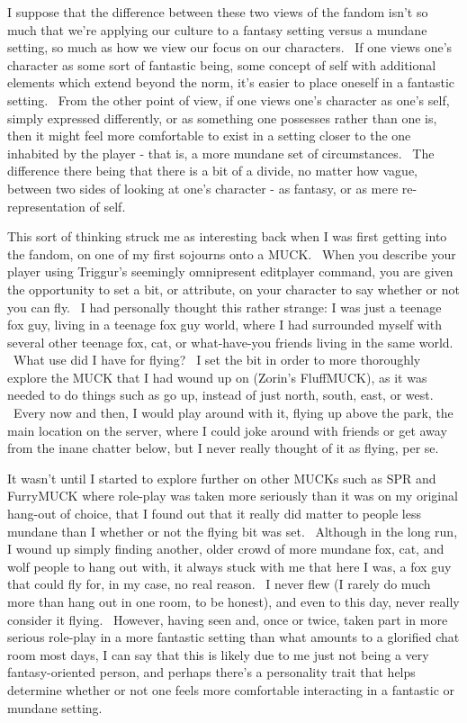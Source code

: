 I suppose that the difference between these two views of the fandom
isn't so much that we're applying our culture to a fantasy setting
versus a mundane setting, so much as how we view our focus on our
characters. ~If one views one's character as some sort of fantastic
being, some concept of self with additional elements which extend beyond
the norm, it's easier to place oneself in a fantastic setting. ~From the
other point of view, if one views one's character as one's self, simply
expressed differently, or as something one possesses rather than one is,
then it might feel more comfortable to exist in a setting closer to the
one inhabited by the player - that is, a more mundane set of
circumstances. ~The difference there being that there is a bit of a
divide, no matter how vague, between two sides of looking at one's
character - as fantasy, or as mere re-representation of self.

This sort of thinking struck me as interesting back when I was first
getting into the fandom, on one of my first sojourns onto a MUCK. ~When
you describe your player using Triggur's seemingly omnipresent
editplayer command, you are given the opportunity to set a bit, or
attribute, on your character to say whether or not you can fly. ~I had
personally thought this rather strange: I was just a teenage fox guy,
living in a teenage fox guy world, where I had surrounded myself with
several other teenage fox, cat, or what-have-you friends living in the
same world. ~What use did I have for flying? ~I set the bit in order to
more thoroughly explore the MUCK that I had wound up on (Zorin's
FluffMUCK), as it was needed to do things such as go up, instead of just
north, south, east, or west. ~Every now and then, I would play around
with it, flying up above the park, the main location on the server,
where I could joke around with friends or get away from the inane
chatter below, but I never really thought of it as flying, per se.

It wasn't until I started to explore further on other MUCKs such as SPR
and FurryMUCK where role-play was taken more seriously than it was on my
original hang-out of choice, that I found out that it really did matter
to people less mundane than I whether or not the flying bit was set.
~Although in the long run, I wound up simply finding another, older
crowd of more mundane fox, cat, and wolf people to hang out with, it
always stuck with me that here I was, a fox guy that could fly for, in
my case, no real reason. ~I never flew (I rarely do much more than hang
out in one room, to be honest), and even to this day, never really
consider it flying. ~However, having seen and, once or twice, taken part
in more serious role-play in a more fantastic setting than what amounts
to a glorified chat room most days, I can say that this is likely due to
me just not being a very fantasy-oriented person, and perhaps there's a
personality trait that helps determine whether or not one feels more
comfortable interacting in a fantastic or mundane setting.

